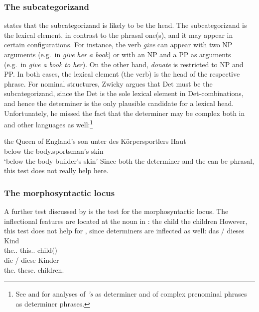 \documentclass[output=paper
  ,nobabel
  ,draftmode
  ,uniformtopskip %
  ,colorlinks, citecolor=brown
]{langscibook}
\begin{document}
\subsubsection{The subcategorizand}

\citet[Section~2.1.2]{Zwicky85a} states that the subcategorizand is likely to be the head. The
subcategorizand is the lexical element, in contrast to the phrasal one(s), and it may appear in certain configurations. For instance,
the verb \emph{give} can appear with two NP arguments (e.g.\ in \emph{give her a book}) or with an NP and a PP as arguments (e.g.\ in \emph{give a book to her}). 
On the other hand, \emph{donate} is restricted to NP and PP. 
In both cases, the lexical element (the verb) is the head of the respective phrase.
For nominal structures, Zwicky argues that Det must be the subcategorizand, since the Det is the sole lexical
element in Det-\nbar combinations, and hence the determiner is the only plausible candidate for a
lexical head.
Unfortunately, he missed the fact that the determiner may be complex both in  and other
languages as well:\footnote{%
  See  and  for analyses of \emph{'s} as determiner and
  of complex prenominal phrases as determiner phrases.
}

\eal
\ex the Queen of England's son
\ex 
\gll unter des Körpersportlers Haut\footnotemark\\
     below the body.sportsman's skin\\
\glt `below the body builder's skin'
\zl
Since both the determiner and the \nbar can be phrasal, this test does not really help here.

\largerpage
\subsubsection{The morphosyntactic locus}

A further test discussed by \citet[Section~2.1.3]{Zwicky85a} is the test for the morphosyntactic
locus. The inflectional features are located at the noun in :
\eal
\ex the child
\ex the children
\zl
However, this test does not help for , since determiners are inflected as well:
\eal
\ex 
\gll das / dieses Kind\\
     the.\SG.\N{} {} this.\SG.\N{} child(\N)\\
\ex 
\gll die / diese Kinder\\
     the.\PL{} {} these.\PL{} children.\PL\\
\zl
\end{document}
